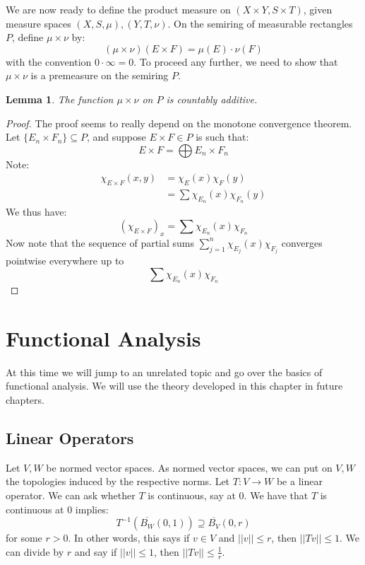 \documentclass[a4paper,12pt]{report}
\newcommand{\ovl}[1]{\overline{#1}}
\newcommand{\sse} {\subseteq}
\newtheorem{lemma}[theorem]{Lemma}
\begin{document}
	\noindent We are now ready to define the product measure on $(X \times Y, S \times T)$, given measure spaces $(X, S, \mu), (Y, T, \nu)$. On the semiring of measurable rectangles $P$, define $\mu \times \nu$ by:
	\[ (\mu \times \nu)(E \times F) = \mu(E) \cdot \nu(F) \]
	with the convention $0 \cdot \infty = 0$. To proceed any further, we need to show that $\mu \times \nu$ is a premeasure on the semiring $P$.
	
	\begin{lemma}
	The function $\mu \times \nu$ on $P$ is countably additive.
	\end{lemma}
	\begin{proof}
	The proof seems to really depend on the monotone convergence theorem. Let $\{E_n \times F_n\} \sse P$, and suppose $E \times F \in P$ is such that:
	\[ E \times F= \bigoplus E_n \times F_n \]
	Note:
	\begin{align*}
	\chi_{E \times F}(x, y) &= \chi_E(x) \chi_F(y) \\
	&= \sum \chi_{E_n}(x) \chi_{F_n}(y) 
	\end{align*}
	We thus have:
	\[ (\chi_{E \times F})_x = \sum \chi_{E_n}(x) \chi_{F_n} \]
	Now note that the sequence of partial sums $\sum_{j=1}^n \chi_{E_j}(x) \chi_{F_j}$ converges pointwise everywhere up to 
	\[ \sum \chi_{E_n}(x) \chi_{F_n} \]
	\end{proof}
	
	
	
	\chapter{Functional Analysis}
	At this time we will jump to an unrelated topic and go over the basics of functional analysis. We will use the theory developed in this chapter in future chapters. 
	
	\section{Linear Operators}
	
	Let $V, W$ be normed vector spaces. As normed vector spaces, we can put on $V, W$ the topologies induced by the respective norms. Let $T : V \rightarrow W$ be a linear operator. We can ask whether $T$ is continuous, say at 0. 
	We have that $T$ is continuous at 0 implies:
	\[ T^{-1}(\ovl{B_W}(0, 1)) \supseteq \ovl{B_V}(0, r) \]
	for some $r > 0$. In other words, this says if $v \in V$ and $||v|| \leq r$, then $||Tv|| \leq 1$. We can divide by $r$ and say if $||v|| \leq 1$, then $||Tv|| \leq \frac{1}{r}$. 
	
\end{document}
